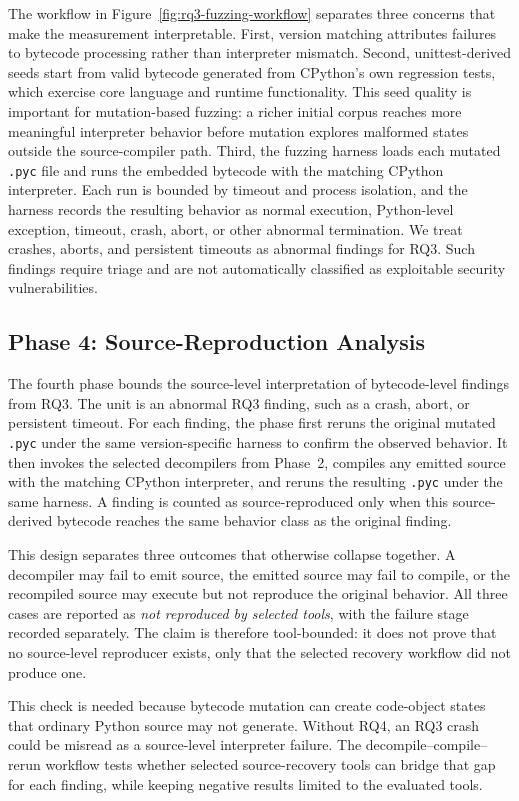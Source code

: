 The workflow in Figure~\ref{fig:rq3-fuzzing-workflow} separates three concerns that make the measurement interpretable.  First, version matching attributes failures to bytecode processing rather than interpreter mismatch.  Second, unittest-derived seeds start from valid bytecode generated from CPython's own regression tests, which exercise core language and runtime functionality.  This seed quality is important for mutation-based fuzzing: a richer initial corpus reaches more meaningful interpreter behavior before mutation explores malformed states outside the source-compiler path.  Third, the fuzzing harness loads each mutated \texttt{.pyc} file and runs the embedded bytecode with the matching CPython interpreter.  Each run is bounded by timeout and process isolation, and the harness records the resulting behavior as normal execution, Python-level exception, timeout, crash, abort, or other abnormal termination.  We treat crashes, aborts, and persistent timeouts as abnormal findings for RQ3.  Such findings require triage and are not automatically classified as exploitable security vulnerabilities.

\subsection{Phase 4: Source-Reproduction Analysis}\label{sec:method:runtime}

The fourth phase bounds the source-level interpretation of bytecode-level findings from RQ3.  The unit is an abnormal RQ3 finding, such as a crash, abort, or persistent timeout.  For each finding, the phase first reruns the original mutated \texttt{.pyc} under the same version-specific harness to confirm the observed behavior.  It then invokes the selected decompilers from Phase~2, compiles any emitted source with the matching CPython interpreter, and reruns the resulting \texttt{.pyc} under the same harness.  A finding is counted as source-reproduced only when this source-derived bytecode reaches the same behavior class as the original finding.

This design separates three outcomes that otherwise collapse together.  A decompiler may fail to emit source, the emitted source may fail to compile, or the recompiled source may execute but not reproduce the original behavior.  All three cases are reported as \emph{not reproduced by selected tools}, with the failure stage recorded separately.  The claim is therefore tool-bounded: it does not prove that no source-level reproducer exists, only that the selected recovery workflow did not produce one.

This check is needed because bytecode mutation can create code-object states that ordinary Python source may not generate.  Without RQ4, an RQ3 crash could be misread as a source-level interpreter failure.  The decompile--compile--rerun workflow tests whether selected source-recovery tools can bridge that gap for each finding, while keeping negative results limited to the evaluated tools.
